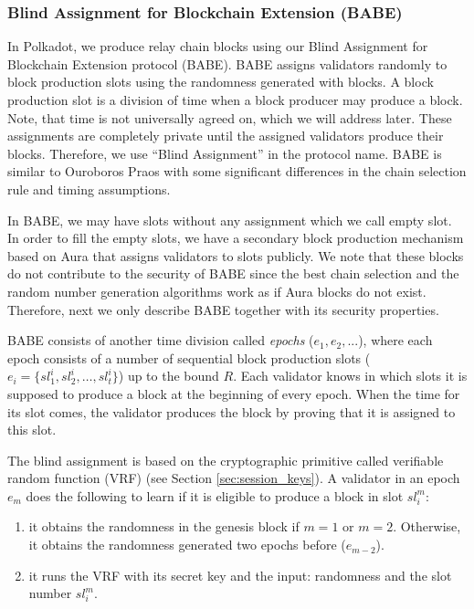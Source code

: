 \documentclass{article}
\newcommand{\D}{\ensuremath{\Delta}}
\begin{document}
\subsubsection{Blind Assignment for Blockchain Extension (BABE)}
\label{sec:babe}

In Polkadot, we produce relay chain blocks using our Blind Assignment for Blockchain Extension protocol (BABE).
BABE assigns validators randomly to block production slots using  the randomness generated with blocks. A block production slot is a division of time when a block producer may produce a block. Note, that time is not universally agreed on, which we will address later.  These assignments are completely private until the assigned validators produce their blocks. Therefore, we use ``Blind Assignment'' in the protocol name. BABE is similar to Ouroboros Praos \cite{Praos} with some significant differences in the chain selection rule and timing assumptions.

In BABE, we may have slots without any assignment
which we call empty slot. 
In order to fill the empty slots, we have a
secondary block production mechanism based on Aura \cite{aura} that assigns validators to slots publicly. We note that these blocks do not contribute to
the security of BABE since the best chain selection and the random number generation algorithms work as if Aura blocks do not exist.
Therefore, next we only describe BABE together with its security properties.


BABE \cite{babe} consists of another time division called \emph{epochs} ($e_1,e_2,...$), where each epoch consists of a number of sequential block production slots (\(e_i = \{sl^i_{1}, sl^i_{2},\ldots,sl^i_{t}\}\)) up to the bound  $R$.
Each validator knows in which slots it is supposed to produce a block at the beginning of every epoch. When the time for its slot comes, the validator produces the block by proving that it is assigned to
this slot.

The blind assignment is based on the cryptographic primitive called verifiable random function (VRF) \cite{vrf} (see Section \ref{sec:session_keys}). 
A validator in an epoch $e_m$  does the following to learn if it is eligible to produce a block in slot $sl_i^m$:
\begin{enumerate}
	\item  it obtains the randomness in the genesis block if $ m = 1  $ or $ m =2 $. Otherwise, it obtains the randomness  generated two epochs before ($e_{m-2}$).
	\item  it runs the VRF with its secret key and the input:  randomness and the slot number $ sl_i^m $.
\end{enumerate}
\end{document}
